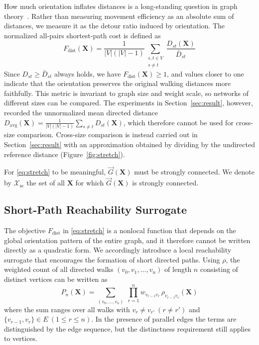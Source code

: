 \documentclass[twocolumn,a4paper]{article}
\begin{document}
How much orientation inflates distances is a long-standing question in graph theory~\cite{chvatal1978distances}. Rather than measuring movement efficiency as an absolute sum of distances, we measure it as the detour ratio induced by orientation. The normalized all-pairs shortest-path cost is defined as
\begin{equation}
F_{\mathrm{dist}}(\mathbf{X})=\frac{1}{|V|(|V|-1)}\sum_{\substack{s,t\in V\\s\neq t}}\frac{D_{st}(\mathbf{X})}{\bar{D}_{st}}
\label{eq:stretch}
\end{equation}
Since \(D_{st}\geq\bar{D}_{st}\) always holds, we have \(F_{\mathrm{dist}}(\mathbf{X})\geq1\), and values closer to one indicate that the orientation preserves the original walking distances more faithfully. This metric is invariant to graph size and weight scale, so networks of different sizes can be compared. The experiments in Section~\ref{sec:result}, however, recorded the unnormalized mean directed distance \(D_{\mathrm{avg}}(\mathbf{X})=\frac{1}{|V|(|V|-1)}\sum_{s\neq t}D_{st}(\mathbf{X})\), which therefore cannot be used for cross-size comparison. Cross-size comparison is instead carried out in Section~\ref{sec:result} with an approximation obtained by dividing by the undirected reference distance (Figure~\ref{fig:stretch}).

For \eqref{eq:stretch} to be meaningful, \(\vec{G}(\mathbf{X})\) must be strongly connected. We denote by \(\mathcal{X}_{\mathrm{sc}}\) the set of all \(\mathbf{X}\) for which \(\vec{G}(\mathbf{X})\) is strongly connected.

\subsection{Short-Path Reachability Surrogate} \label{subsec:model_hop}

The objective \(F_{\mathrm{dist}}\) in \eqref{eq:stretch} is a nonlocal function that depends on the global orientation pattern of the entire graph, and it therefore cannot be written directly as a quadratic form. We accordingly introduce a local reachability surrogate that encourages the formation of short directed paths. Using \(\rho\), the weighted count of all directed walks \((v_0,v_1,\dots,v_n)\) of length \(n\) consisting of distinct vertices can be written as
\begin{equation}
P_n(\mathbf{X})=\sum_{(v_0,\dots,v_n)}\;\prod_{r=1}^{n}w_{v_{r-1}v_r}\,\rho_{v_{r-1}v_r}(\mathbf{X})
\label{eq:pn}
\end{equation}
where the sum ranges over all walks with \(v_r\neq v_{r'}\ (r\neq r')\) and \(\{v_{r-1},v_r\}\in E\ (1\leq r\leq n)\). In the presence of parallel edges the terms are distinguished by the edge sequence, but the distinctness requirement still applies to vertices.
\end{document}
